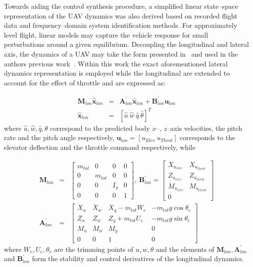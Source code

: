 
Towards aiding the control synthesis procedure, a simplified linear state--space representation of the UAV dynamics was also derived based on recorded flight data and frequency--domain system identification methods. For approximately level flight, linear models may capture the vehicle response for small perturbations around a given equilibrium. Decoupling the longitudinal and lateral axis, the dynamics of a UAV may take the form presented in~\cite{dorobantu2011frequency} and used in the authors previous work~\cite{Oettershagen_MED14_L1MPC}. Within this work the exact aforementioned lateral dynamics representation is employed while the longitudinal are extended to account for the effect of throttle and are expressed as:

\small
\begin{eqnarray}\label{LON_DYN}
 \mathbf{M}_{lon}\dot{\mathbf{\hat{x}}}_{lon} &=& \mathbf{A}^\prime_{lon}\mathbf{\hat{x}}_{lon}+\mathbf{B}^\prime_{lon}\mathbf{u}_{lon} \\ \nonumber
 \mathbf{\hat{x}}_{lon} &=& \left[ \hat{u}~\hat{w}~\hat{q}~\hat{\theta} \right]^T
\end{eqnarray}
\normalsize
where $\hat{u},\hat{w},\hat{q},\theta$ correspond to the predicted body $x$--, $z$--axis velocities, the pitch rate and the pitch angle respectively, $\mathbf{u}_{lon} = [u_{Elev}~u_{Throt}]$ corresponds to the elevator deflection and the throttle command respectively, while

\footnotesize
\begin{eqnarray}
\mathbf{M}_{lon} &=& \begin{bmatrix}

m_{tot} & 0 & 0 & 0\\ 
0 & m_{tot} & 0 & 0\\ 
0 & 0 & I_y & 0\\ 
0 & 0 & 0 & 1
\end{bmatrix},~
\mathbf{B}^\prime_{lon} = \begin{bmatrix}
X_{u_{elev}} & X_{u_{throt}}\\ 
Z_{u_{elev}} & Z_{u_{throt}}\\ 
M_{u_{elev}} & M_{u_{throt}}\\ 
0
\end{bmatrix} \\ \nonumber
\mathbf{A}^\prime_{lon} &=& \begin{bmatrix}
X_u & X_w & X_q-m_{tot}W_e & -m_{tot}g\cos\theta_e\\ 
Z_u & Z_w & Z_q+m_{tot}U_e & -m_{tot}g\sin\theta_e\\ 
M_u & M_w & M_q & 0 \\ 
0 & 0 & 1 & 0
\end{bmatrix}
\end{eqnarray}
\normalsize
where $W_e,U_e,\theta_e$ are the trimming points of $u,w,\theta$ and the elements of $\mathbf{M}_{lon},\mathbf{A}^\prime_{lon}$ and $\mathbf{B}^\prime_{lon}$ form the stability and control derivatives of the longitudinal dynamics. 

